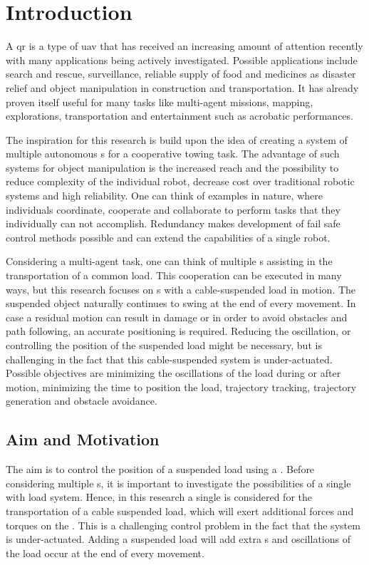 \chapter{Introduction} \label{ch:intro}
A \acf{qr} is a type of \acf*{uav} that has received an increasing amount of attention recently with many applications being actively investigated. Possible applications include search and rescue, surveillance, reliable supply of food and medicines as disaster relief and object manipulation in construction and transportation. It has already proven itself useful for many tasks like multi-agent missions, mapping, explorations, transportation and entertainment such as acrobatic performances.

The inspiration for this research is build upon the idea of creating a system of multiple autonomous s for a cooperative towing task. The advantage of such systems for object manipulation is the increased reach and the possibility to reduce complexity of the individual robot, decrease cost over traditional robotic systems and high reliability. One can think of examples in nature, where individuals coordinate, cooperate and collaborate to perform tasks that they individually can not accomplish. Redundancy makes development of fail safe control methods possible and can extend the capabilities of a single robot. 						

Considering a multi-agent task, one can think of multiple s assisting in the transportation of a common load. This cooperation can be executed in many ways, but this research focuses on s with a cable-suspended load in motion. The suspended object naturally continues to swing at the end of every movement. In case a residual motion can result in damage or in order to avoid obstacles and path following, an accurate positioning is required. Reducing the oscillation, or controlling the position of the suspended load might be necessary, but is challenging in the fact that this cable-suspended system is under-actuated. Possible objectives are minimizing the oscillations of the load during or after motion, minimizing the time to position the load, trajectory tracking, trajectory generation and obstacle avoidance.

\newpage
\section{Aim and Motivation}\label{sec:int.motivation}
The aim is to control the position of a suspended load using a . Before considering multiple s, it is important to investigate the possibilities of a single  with load system. Hence, in this research a single  is considered for the transportation of a cable suspended load, which will exert additional forces and torques on the . This is a challenging control problem in the fact that the  system is under-actuated. Adding a suspended load will add extra s and oscillations of the load occur at the end of every movement. 

